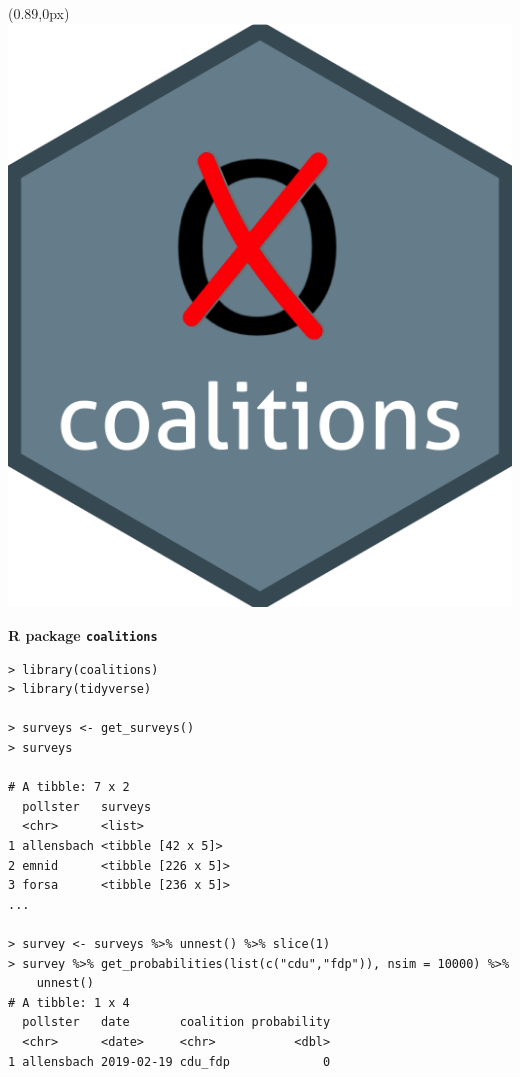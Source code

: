 \documentclass[10pt,xcolor=dvipsnames,t,headinclude,headsepline=1.5cm,usepdftitle=false]{beamer}
\begin{document}
\begin{frame}[fragile]
\begin{textblock*}{1.25cm}(0.89\textwidth,0px)
\includegraphics[width=1\textwidth]{figures/coalitions_hex}
\end{textblock*}
\vspace{10px}
\textbf{R package \texttt{coalitions}}
\\[0.7cm]
\begin{lstlisting}
> library(coalitions)
> library(tidyverse)

> surveys <- get_surveys()
> surveys

# A tibble: 7 x 2
  pollster   surveys
  <chr>      <list>
1 allensbach <tibble [42 x 5]>
2 emnid      <tibble [226 x 5]>
3 forsa      <tibble [236 x 5]>
...

> survey <- surveys %>% unnest() %>% slice(1)
> survey %>% get_probabilities(list(c("cdu","fdp")), nsim = 10000) %>%
    unnest()
# A tibble: 1 x 4
  pollster   date       coalition probability
  <chr>      <date>     <chr>           <dbl>
1 allensbach 2019-02-19 cdu_fdp             0
\end{lstlisting}
\end{frame}
\end{document}
